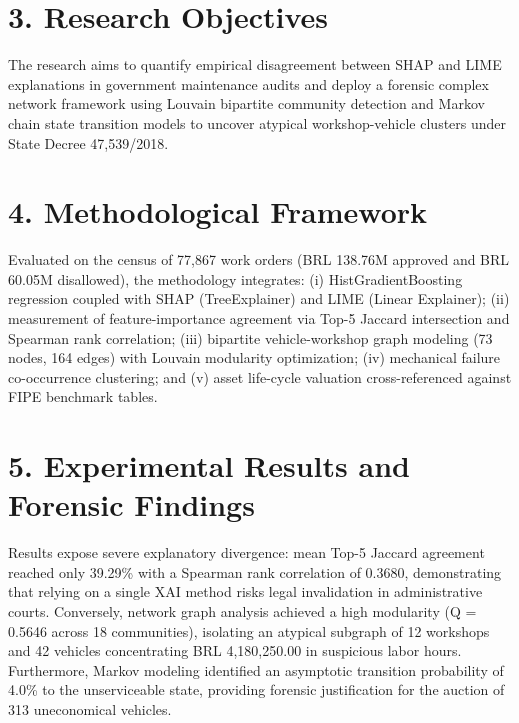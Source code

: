 \documentclass[10pt,a4paper,journal]{article}
\begin{document}
\section{3. Research Objectives}
The research aims to quantify empirical disagreement between SHAP and LIME explanations in government maintenance audits and deploy a forensic complex network framework using Louvain bipartite community detection and Markov chain state transition models to uncover atypical workshop-vehicle clusters under State Decree 47,539/2018.

\section{4. Methodological Framework}
Evaluated on the census of 77,867 work orders (BRL 138.76M approved and BRL 60.05M disallowed), the methodology integrates: (i) HistGradientBoosting regression coupled with SHAP (TreeExplainer) and LIME (Linear Explainer); (ii) measurement of feature-importance agreement via Top-5 Jaccard intersection and Spearman rank correlation; (iii) bipartite vehicle-workshop graph modeling (73 nodes, 164 edges) with Louvain modularity optimization; (iv) mechanical failure co-occurrence clustering; and (v) asset life-cycle valuation cross-referenced against FIPE benchmark tables.

\section{5. Experimental Results and Forensic Findings}
Results expose severe explanatory divergence: mean Top-5 Jaccard agreement reached only 39.29\% with a Spearman rank correlation of 0.3680, demonstrating that relying on a single XAI method risks legal invalidation in administrative courts. Conversely, network graph analysis achieved a high modularity (Q = 0.5646 across 18 communities), isolating an atypical subgraph of 12 workshops and 42 vehicles concentrating BRL 4,180,250.00 in suspicious labor hours. Furthermore, Markov modeling identified an asymptotic transition probability of 4.0\% to the unserviceable state, providing forensic justification for the auction of 313 uneconomical vehicles.
\end{document}
